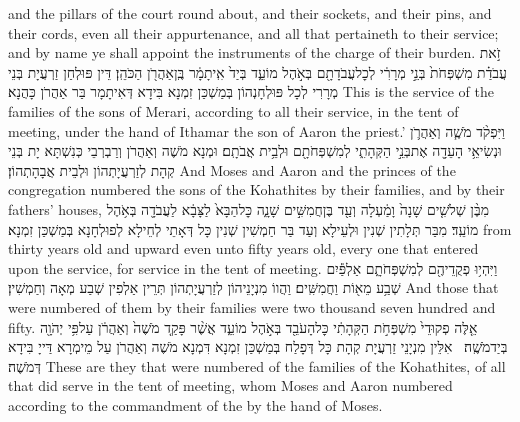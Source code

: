 {and the pillars of the court round about, and their sockets, and their pins, and their cords, even all their appurtenance, and all that pertaineth to their service; and by name ye shall appoint the instruments of the charge of their burden.}{}
{זֹ֣את עֲבֹדַ֗ת מִשְׁפְּחֹת֙ בְּנֵ֣י מְרָרִ֔י לְכׇל\maqqaf עֲבֹדָתָ֖ם בְּאֹ֣הֶל מוֹעֵ֑ד בְּיַד֙ אִֽיתָמָ֔ר בֶּֽן\maqqaf אַהֲרֹ֖ן הַכֹּהֵֽן׃}
{דֵּין פּוּלְחַן זַרְעֲיָת בְּנֵי מְרָרִי לְכָל פּוּלְחָנְהוֹן בְּמַשְׁכַּן זִמְנָא בִּידָא דְּאִיתָמָר בַּר אַהֲרֹן כָּהֲנָא׃}
{This is the service of the families of the sons of Merari, according to all their service, in the tent of meeting, under the hand of Ithamar the son of Aaron the priest.’}{}
{וַיִּפְקֹ֨ד מֹשֶׁ֧ה וְאַהֲרֹ֛ן וּנְשִׂיאֵ֥י הָעֵדָ֖ה אֶת\maqqaf בְּנֵ֣י הַקְּהָתִ֑י לְמִשְׁפְּחֹתָ֖ם וּלְבֵ֥ית אֲבֹתָֽם׃}
{וּמְנָא מֹשֶׁה וְאַהֲרֹן וְרַבְרְבֵי כְּנִשְׁתָּא יָת בְּנֵי קְהָת לְזַרְעֲיָתְהוֹן וּלְבֵית אֲבָהָתְהוֹן׃}
{And Moses and Aaron and the princes of the congregation numbered the sons of the Kohathites by their families, and by their fathers’ houses,}{}
{מִבֶּ֨ן שְׁלֹשִׁ֤ים שָׁנָה֙ וָמַ֔עְלָה וְעַ֖ד בֶּן\maqqaf חֲמִשִּׁ֣ים שָׁנָ֑ה כׇּל\maqqaf הַבָּא֙ לַצָּבָ֔א לַעֲבֹדָ֖ה בְּאֹ֥הֶל מוֹעֵֽד׃}
{מִבַּר תְּלָתִין שְׁנִין וּלְעֵילָא וְעַד בַּר חַמְשִׁין שְׁנִין כָּל דְּאָתֵי לְחֵילָא לְפוּלְחָנָא בְּמַשְׁכַּן זִמְנָא׃}
{from thirty years old and upward even unto fifty years old, every one that entered upon the service, for service in the tent of meeting.}{}
{וַיִּהְי֥וּ פְקֻדֵיהֶ֖ם לְמִשְׁפְּחֹתָ֑ם אַלְפַּ֕יִם שְׁבַ֥ע מֵא֖וֹת וַחֲמִשִּֽׁים׃}
{וַהֲווֹ מִנְיָנֵיהוֹן לְזַרְעֲיָתְהוֹן תְּרֵין אַלְפִין שְׁבַע מְאָה וְחַמְשִׁין׃}
{And those that were numbered of them by their families were two thousand seven hundred and fifty.}{}
{אֵ֤לֶּה פְקוּדֵי֙ מִשְׁפְּחֹ֣ת הַקְּהָתִ֔י כׇּל\maqqaf הָעֹבֵ֖ד בְּאֹ֣הֶל מוֹעֵ֑ד אֲשֶׁ֨ר פָּקַ֤ד מֹשֶׁה֙ וְאַהֲרֹ֔ן עַל\maqqaf פִּ֥י יְהֹוָ֖ה בְּיַד\maqqaf מֹשֶֽׁה׃ \setuma }
{אִלֵּין מִנְיָנֵי זַרְעֲיָת קְהָת כָּל דְּפָלַח בְּמַשְׁכַּן זִמְנָא דִּמְנָא מֹשֶׁה וְאַהֲרֹן עַל מֵימְרָא דַּייָ בִּידָא דְּמֹשֶׁה׃}
{These are they that were numbered of the families of the Kohathites, of all that did serve in the tent of meeting, whom Moses and Aaron numbered according to the commandment of the \lord\space by the hand of Moses.}{}

